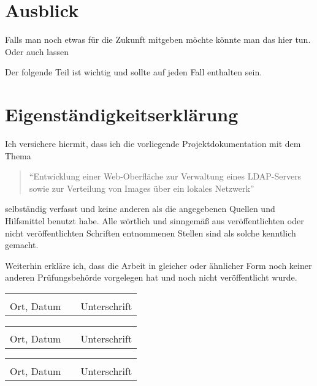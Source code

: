 \newpage
\section{Ausblick}
Falls man noch etwas für die Zukunft mitgeben möchte könnte man das hier tun. Oder auch lassen \Winkey
{}

\newpage
Der folgende Teil ist wichtig und sollte auf jeden Fall enthalten sein.

\section{Eigenständigkeitserklärung}
Ich versichere hiermit, dass ich die vorliegende Projektdokumentation mit dem Thema 
\begin{quote}
``Entwicklung einer Web-Oberfläche zur Verwaltung eines LDAP-Servers sowie zur Verteilung von Images über ein lokales Netzwerk''
\end{quote}
 selbständig verfasst und keine anderen als die angegebenen Quellen und Hilfsmittel benutzt habe. Alle wörtlich und sinngemäß aus veröffentlichten oder nicht veröffentlichten Schriften entnommenen Stellen sind als solche kenntlich gemacht.

Weiterhin erkläre ich, dass die Arbeit in gleicher oder ähnlicher Form noch keiner anderen Prüfungsbehörde vorgelegen hat und noch nicht veröffentlicht wurde.

\vspace{1.5cm}
\begin{tabular}{lp{2em}l}
 \hspace{6cm}   && \hspace{6cm} \\\cline{1-1}\cline{3-3}
 Ort, Datum     && Unterschrift
\end{tabular}
\par\bigskip
\vspace{1.5cm}
\begin{tabular}{lp{2em}l}
 \hspace{6cm}   && \hspace{6cm} \\\cline{1-1}\cline{3-3}
 Ort, Datum     && Unterschrift
\end{tabular}
\par\bigskip
\vspace{1.5cm}
\begin{tabular}{lp{2em}l}
 \hspace{6cm}   && \hspace{6cm} \\\cline{1-1}\cline{3-3}
 Ort, Datum     && Unterschrift
\end{tabular}

